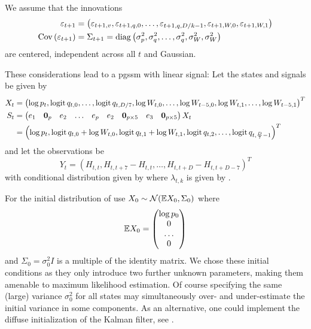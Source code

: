We assume that the innovations 
\begin{align*}
    \varepsilon_{t + 1} &= \left( \varepsilon_{t + 1, v}, \varepsilon_{t + 1, q,0}, \dots, \varepsilon_{t + 1, q, D / k - 1}, \varepsilon_{t + 1, W, 0}, \varepsilon_{t + 1, W, 1}  \right) \\
    \operatorname{Cov} \left( \varepsilon_{t + 1 } \right) &= \Sigma_{t + 1} = \operatorname{diag} \left( \sigma^{2}_p, \sigma^2_{q}, \dots, \sigma^{2}_q, \sigma^{2}_W , \sigma^{2}_{W}\right)
\end{align*} are centered, independent across all $t$ and Gaussian.

These considerations lead to a \acrshort{pgssm} with linear signal: Let the states and signals be given by 
\begin{align*}
   X_{t} &= \left( \log p_{t}, \operatorname{logit} q_{t,0}, \dots, \operatorname{logit} q_{t, D / 7}, \log W_{t, 0}, \dots, \log W_{t - 5, 0}, \log W_{t, 1}, \dots, \log W_{t - 5, 1} \right) ^{T} \\
   S_{t} &= \begin{pmatrix}
       e_{1} & \mathbf 0_{p} & e_{2} & \dots & e_{p} & e_{2} & \mathbf 0_{p \times 5} & e_{3} & \mathbf 0_{p \times 5}
   \end{pmatrix} X_{t} \\
   & = \left( \log p_{t}, \operatorname{logit} q_{t,0} + \log W_{t, 0}, \operatorname{logit} q_{t, 1} + \log W_{t, 1}, \operatorname{logit} q_{t, 2}, \dots, \operatorname{logit} q_{t, \frac{D}{7} - 1} \right)^{T}
\end{align*}
and let the observations be 
$$
    Y_{t} = \left( H_{t,t},  H_{t, t + 7} - H^{}_{t, t} , \dots, H_{t, t + D} - H^{}_{t, t + D - 7}\right)^{T}
$$
with conditional distribution given by  where $\lambda_{t,k}$ is given by .

For the initial distribution of use $X_{0} \sim \mathcal N(\mathbb E X_{0}, \Sigma_0)$ where 
$$
    \mathbb E X_{0} = \begin{pmatrix}
        \log p_{0} \\
        0 \\
        \dots \\
        0
    \end{pmatrix}
$$
and $\Sigma_{0} = \sigma^{2}_0 I$ is a multiple of the identity matrix. We chose these initial conditions as they only introduce two further unknown parameters, making them amenable to maximum likelihood estimation. Of course specifying the same (large) variance $\sigma^{2}_0$ for all states may simultaneously over- and under-estimate the initial variance in some components. As an alternative, one could implement the diffuse initialization of the Kalman filter, see \citep{Ansley1985Estimation,Koopman1997Exact}.

